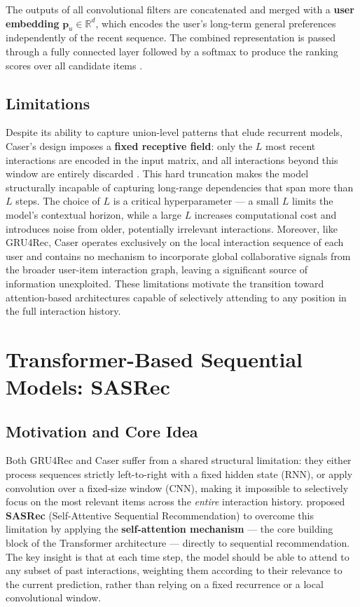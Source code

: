 \documentclass[12pt,a4paper]{report}
\newcommand{\textcite}[1]{\citet{#1}}
\newcommand{\parencite}[1]{\citep{#1}}
\begin{document}
The outputs of all convolutional filters are concatenated and merged
with a \textbf{user embedding} $\mathbf{p}_u \in \mathbb{R}^d$,
which encodes the user's long-term general preferences independently
of the recent sequence. The combined representation is passed through
a fully connected layer followed by a softmax to produce the ranking
scores over all candidate items \parencite{tang2018caser}.

\subsection{Limitations}

Despite its ability to capture union-level patterns that elude
recurrent models, Caser's design imposes a \textbf{fixed receptive
field}: only the $L$ most recent interactions are encoded in the
input matrix, and all interactions beyond this window are entirely
discarded \parencite{tang2018caser}. This hard truncation makes the
model structurally incapable of capturing long-range dependencies
that span more than $L$ steps. The choice of $L$ is a critical
hyperparameter --- a small $L$ limits the model's contextual horizon,
while a large $L$ increases computational cost and introduces noise
from older, potentially irrelevant interactions. Moreover, like
GRU4Rec, Caser operates exclusively on the local interaction
sequence of each user and contains no mechanism to incorporate
global collaborative signals from the broader user-item interaction
graph, leaving a significant source of information unexploited.
These limitations motivate the transition toward attention-based
architectures capable of selectively attending to any position in
the full interaction history.

\section{Transformer-Based Sequential Models: SASRec}

\subsection{Motivation and Core Idea}

Both GRU4Rec and Caser suffer from a shared structural limitation:
they either process sequences strictly left-to-right with a fixed
hidden state (RNN), or apply convolution over a fixed-size window
(CNN), making it impossible to selectively focus on the most
relevant items across the \textit{entire} interaction history.
\textcite{kang2018self} proposed \textbf{SASRec} (Self-Attentive
Sequential Recommendation) to overcome this limitation by applying
the \textbf{self-attention mechanism} --- the core building block of
the Transformer architecture --- directly to sequential
recommendation. The key insight is that at each time step, the model
should be able to attend to any subset of past interactions, weighting
them according to their relevance to the current prediction, rather
than relying on a fixed recurrence or a local convolutional window.
\end{document}
